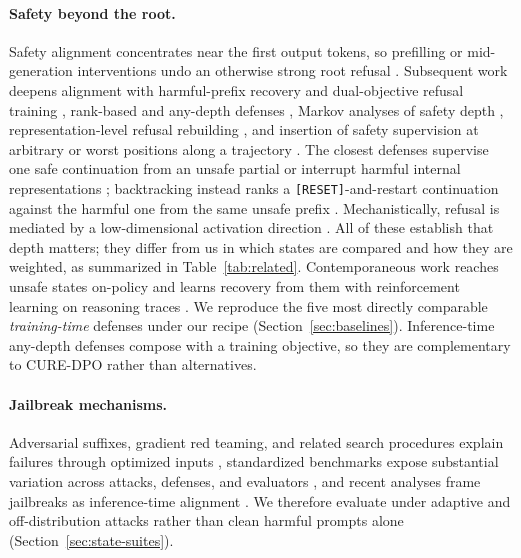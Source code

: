 \documentclass[11pt]{article}
\newcommand{\method}{CURE-DPO}
\begin{document}
\paragraph{Safety beyond the root.}
Safety alignment concentrates near the first output tokens, so prefilling or
mid-generation interventions undo an otherwise strong root refusal
\citep{qi2024safety}. Subsequent work deepens alignment with harmful-prefix
recovery and dual-objective refusal training \citep{zhao2025door}, rank-based
and any-depth defenses \citep{vega2025presto,zhang2025anydepth}, Markov
analyses of safety depth \citep{kao2025safetydepth}, representation-level
refusal rebuilding \citep{xie2025deeprefusal}, and insertion of safety
supervision at arbitrary or worst positions along a trajectory
\citep{lyu2026consistency,park2026trajectory}. The closest defenses supervise
one safe continuation from an unsafe partial \citep{qi2024safety} or interrupt
harmful internal representations \citep{zou2024circuit}; backtracking instead
ranks a \texttt{[RESET]}-and-restart continuation against the harmful one from
the same unsafe prefix \citep{zhang2024backtracking}. Mechanistically, refusal is
mediated by a low-dimensional activation direction \citep{arditi2024refusal}.
All of these establish that depth matters; they differ from us in which states
are compared and how they are weighted, as summarized in
Table~\ref{tab:related}. Contemporaneous work reaches unsafe states on-policy
and learns recovery from them with reinforcement learning on reasoning traces
\citep{zhang2026selfreset}. We reproduce the five most directly
comparable \emph{training-time} defenses under our recipe
(Section~\ref{sec:baselines}). Inference-time any-depth defenses
\citep{zhang2025anydepth} compose with a training objective, so they are
complementary to \method{} rather than alternatives.

\paragraph{Jailbreak mechanisms.}
Adversarial suffixes, gradient red teaming, and related search procedures
explain failures through optimized inputs
\citep{zou2023gcg,wichers2024gbrt,chao2023pair}, standardized benchmarks expose
substantial variation across attacks, defenses, and evaluators
\citep{mazeika2024harmbench,chao2024jailbreakbench,souly2024strongreject}, and
recent analyses frame jailbreaks as inference-time alignment
\citep{beetham2026liar,zhao2026neurons}. We therefore evaluate under adaptive
and off-distribution attacks rather than clean harmful prompts alone
(Section~\ref{sec:state-suites}).
\end{document}
